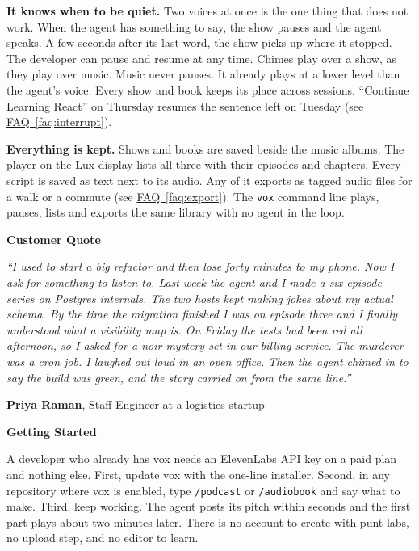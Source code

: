\documentclass[11pt,letterpaper]{article} %
\newcommand{\prsection}[1]{%
  \vspace{1em}%
  {\large\bfseries\color{SectionBlue}#1}%
  \vspace{0.3em}\par%
}
\newcommand{\faqref}[1]{\hyperref[#1]{FAQ~\ref*{#1}}}
\begin{document}
\textbf{It knows when to be quiet.} Two voices at once is the one thing
that does not work. When the agent has something to say, the show pauses
and the agent speaks. A few seconds after its last word, the show picks up
where it stopped. The developer can pause and resume at any time. Chimes
play over a show, as they play over music. Music never pauses. It already
plays at a lower level than the agent's voice. Every show and book keeps its place across sessions.
``Continue Learning React'' on Thursday resumes the sentence left on
Tuesday (see \faqref{faq:interrupt}).

\textbf{Everything is kept.} Shows and books are saved beside the music
albums. The player on the Lux display lists all three with their episodes
and chapters. Every script is saved as text next to its audio. Any of it
exports as tagged audio files for a walk or a commute
(see \faqref{faq:export}). The \texttt{vox}
command line plays, pauses, lists and exports the same library with no
agent in the loop.

\prsection{Customer Quote}

\begin{customerquote}
\textit{``I used to start a big refactor and then lose forty minutes to my
phone. Now I ask for something to listen to. Last week the agent and I made a
six-episode series on Postgres internals. The two hosts kept making jokes
about my actual schema. By the time the migration finished I was on episode
three and I finally understood what a visibility map is. On Friday the tests
had been red all afternoon, so I asked for a noir mystery set in our billing
service. The murderer was a cron job. I laughed out loud in an open office.
Then the agent chimed in to say the build was green, and the story carried
on from the same line.''}

\raggedleft \textbf{Priya Raman}, Staff Engineer at a logistics startup
\end{customerquote}

\prsection{Getting Started}

A developer who already has vox needs an ElevenLabs API key on a paid plan
and nothing else. First, update vox with the one-line installer. Second, in
any repository where vox is enabled, type \texttt{/podcast} or
\texttt{/audiobook} and say what to make. Third, keep working. The agent
posts its pitch within seconds and the first part plays about two minutes
later. There is no account to create with punt-labs, no upload step, and no
editor to learn.
\end{document}
